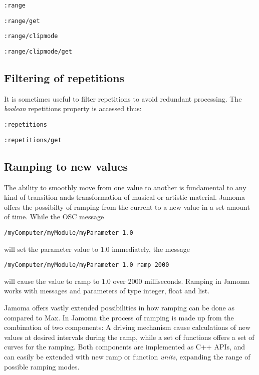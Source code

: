 \documentclass{sig-alternate}
\begin{document}
\texttt{:range}

\texttt{:range/get}

\texttt{:range/clipmode}

\texttt{:range/clipmode/get}





\subsection{Filtering of repetitions} %
\label{sub:filtering_of_repetitions}

It is sometimes useful to filter repetitions to avoid redundant processing. The \emph{boolean} repetitions property is accessed thus:

\texttt{:repetitions}

\texttt{:repetitions/get}





\subsection{Ramping to new values} %
\label{sub:ramping_to_new_values}

The ability to smoothly move from one value to another is fundamental to any kind of transition ands transformation of musical or artistic material. Jamoma offers the possibilty of ramping from the current to a new value in a set amount of time. While the OSC message

\texttt{/myComputer/myModule/myParameter 1.0}

will set the parameter value to $1.0$ immediately, the message

\texttt{/myComputer/myModule/myParameter 1.0 ramp 2000}

will cause the value to ramp to $1.0$ over 2000 milliseconds. Ramping in Jamoma works with messages and parameters of type integer, float and list.

Jamoma offers vastly extended possibilities in how ramping can be done as compared to Max. In Jamoma the process of ramping is made up from the combination of two components: A driving mechanism cause calculations of new values at desired intervals during the ramp, while a set of functions offers a set of curves for the ramping. Both components are implemented as C++ APIs, and can easily be extended with new ramp or function \emph{units}, expanding the range of possible ramping modes.
\end{document}
